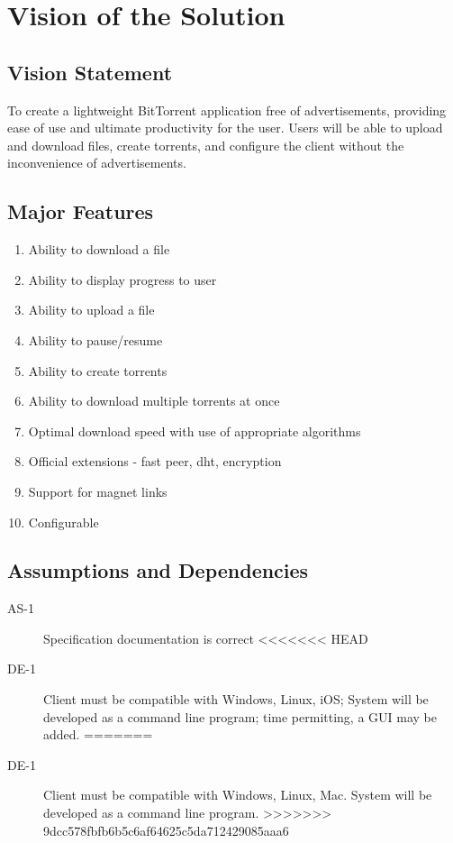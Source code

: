 \documentclass[letter]{scrartcl}
\begin{document}
\section{Vision of the Solution}
\subsection{Vision Statement}
To create a lightweight BitTorrent application free of advertisements, providing ease of use and ultimate productivity for the user.  Users will be able to upload and download files, create torrents, and configure the client without the inconvenience of advertisements.
\subsection{Major Features}
\begin{enumerate}
\item Ability to download a file
\item Ability to display progress to user
\item Ability to upload a file
\item Ability to pause/resume
\item Ability to create torrents
\item Ability to download multiple torrents at once
\item Optimal download speed with use of appropriate algorithms
\item Official extensions - fast peer, dht, encryption
\item Support for magnet links
\item Configurable
\end{enumerate}

\subsection{Assumptions and Dependencies}
\begin{description}
\item[AS-1] Specification documentation is correct
<<<<<<< HEAD
\item[DE-1] Client must be compatible with Windows, Linux, iOS;
System will be developed as a command line program; time permitting, a GUI may be added.
=======
\item[DE-1] Client must be compatible with Windows, Linux, Mac. 
System will be developed as a command line program.
>>>>>>> 9dcc578fbfb6b5c6af64625c5da712429085aaa6
\end{description}
\end{document}
